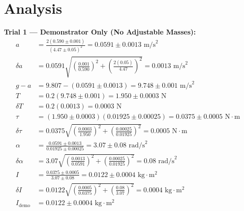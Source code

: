 \documentclass[11pt]{article}
\begin{document}
\section*{Analysis}

\textbf{Trial 1 — Demonstrator Only (No Adjustable Masses):}
\begin{align*}
a &= \frac{2(0.590 \pm 0.001)}{(4.47 \pm 0.05)^2} = 0.0591 \pm 0.0013\text{ m/s}^2 \\
\delta a &= 0.0591\sqrt{\left(\frac{0.001}{0.590}\right)^2 + \left(\frac{2(0.05)}{4.47}\right)^2} = 0.0013\text{ m/s}^2 \\
g - a &= 9.807 - (0.0591 \pm 0.0013) = 9.748 \pm 0.001\text{ m/s}^2 \\
T &= 0.2(9.748 \pm 0.001) = 1.950 \pm 0.0003\text{ N} \\
\delta T &= 0.2(0.0013) = 0.0003\text{ N} \\
\tau &= (1.950 \pm 0.0003)(0.01925 \pm 0.00025) = 0.0375 \pm 0.0005\text{ N}\cdot\text{m} \\
\delta\tau &= 0.0375\sqrt{\left(\frac{0.0003}{1.950}\right)^2 + \left(\frac{0.00025}{0.01925}\right)^2} = 0.0005\text{ N}\cdot\text{m} \\
\alpha &= \frac{0.0591 \pm 0.0013}{0.01925 \pm 0.00025} = 3.07 \pm 0.08\text{ rad/s}^2 \\
\delta\alpha &= 3.07\sqrt{\left(\frac{0.0013}{0.0591}\right)^2 + \left(\frac{0.00025}{0.01925}\right)^2} = 0.08\text{ rad/s}^2 \\
I &= \frac{0.0375 \pm 0.0005}{3.07 \pm 0.08} = 0.0122 \pm 0.0004\text{ kg}\cdot\text{m}^2 \\
\delta I &= 0.0122\sqrt{\left(\frac{0.0005}{0.0375}\right)^2 + \left(\frac{0.08}{3.07}\right)^2} = 0.0004\text{ kg}\cdot\text{m}^2 \\
I_{\text{demo}} &= 0.0122 \pm 0.0004\text{ kg}\cdot\text{m}^2
\end{align*}
\end{document}
